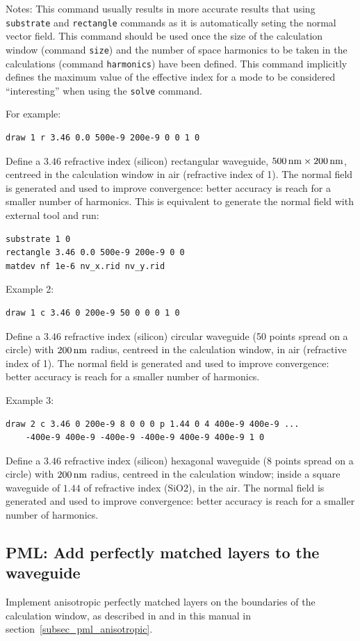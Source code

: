 Notes:
	This command usually results in more accurate results that using \lstinline!substrate! and \lstinline!rectangle! commands as it is automatically seting the normal vector field.
    This command should be used once the size of the calculation window (command \lstinline!size!)  and    the number of space harmonics to be taken in the calculations (command \lstinline!harmonics!)  have been defined.
    This command implicitly defines the maximum value of the effective index for a mode to be considered ``interesting'' when using the \lstinline!solve! command.

For example:
\begin{lstlisting}
draw 1 r 3.46 0.0 500e-9 200e-9 0 0 1 0
\end{lstlisting}
Define a $3.46$ refractive index (silicon) rectangular waveguide, $500\,\mathrm{nm} \times 200\,\mathrm{nm}$, centreed in the calculation window in air (refractive index of 1). The normal field is generated and used to improve convergence: better accuracy is reach for a smaller number of harmonics. This is equivalent to generate the normal field with external tool and run:
\begin{lstlisting}
substrate 1 0
rectangle 3.46 0.0 500e-9 200e-9 0 0
matdev nf 1e-6 nv_x.rid nv_y.rid
\end{lstlisting}

Example 2:
\begin{lstlisting}
draw 1 c 3.46 0 200e-9 50 0 0 0 1 0 
\end{lstlisting}
Define a $3.46$ refractive index (silicon) circular waveguide (50 points spread on a circle) with $200\,\mathrm{nm}$ radius, centreed in the calculation window, in air (refractive index of 1). The normal field is generated and used to improve convergence: better accuracy is reach for a smaller number of harmonics.


Example 3:
\begin{lstlisting}
draw 2 c 3.46 0 200e-9 8 0 0 0 p 1.44 0 4 400e-9 400e-9 ...
	-400e-9 400e-9 -400e-9 -400e-9 400e-9 400e-9 1 0 
\end{lstlisting}
Define a $3.46$ refractive index (silicon) hexagonal waveguide (8 points spread on a circle) with $200\,\mathrm{nm}$ radius, centreed in the calculation window; inside a square waveguide of $1.44$ of refractive index (SiO2), in the air. The normal field is generated and used to improve convergence: better accuracy is reach for a smaller number of harmonics.

\subsection{PML: Add perfectly matched layers to the waveguide}
\label{subsec_pml}
Implement anisotropic perfectly matched layers on the boundaries of the calculation window, as described in \cite{silberstein2001ugt} and in this manual in section~\ref{subsec_pml_anisotropic}.
 
